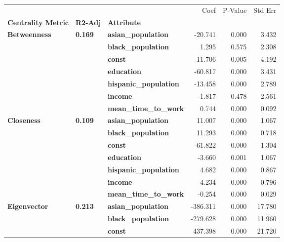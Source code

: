\begin{tabular}{lllrrr}
\toprule
             &       &                   &     Coef &  P-Value &  Std Err \\
\textbf{Centrality Metric} & \textbf{R2-Adj} & \textbf{Attribute} &          &          &          \\
\midrule
\multirow{7}{*}{\textbf{Betweenness}} & \multirow{7}{*}{\textbf{0.169}} & \textbf{asian\_population} &  -20.741 &    0.000 &    3.432 \\
             &       & \textbf{black\_population} &    1.295 &    0.575 &    2.308 \\
             &       & \textbf{const} &  -11.706 &    0.005 &    4.192 \\
             &       & \textbf{education} &  -60.817 &    0.000 &    3.431 \\
             &       & \textbf{hispanic\_population} &  -13.458 &    0.000 &    2.789 \\
             &       & \textbf{income} &   -1.817 &    0.478 &    2.561 \\
             &       & \textbf{mean\_time\_to\_work} &    0.744 &    0.000 &    0.092 \\
\cline{1-6}
\cline{2-6}
\multirow{7}{*}{\textbf{Closeness}} & \multirow{7}{*}{\textbf{0.109}} & \textbf{asian\_population} &   11.007 &    0.000 &    1.067 \\
             &       & \textbf{black\_population} &   11.293 &    0.000 &    0.718 \\
             &       & \textbf{const} &  -61.822 &    0.000 &    1.304 \\
             &       & \textbf{education} &   -3.660 &    0.001 &    1.067 \\
             &       & \textbf{hispanic\_population} &    4.682 &    0.000 &    0.867 \\
             &       & \textbf{income} &   -4.234 &    0.000 &    0.796 \\
             &       & \textbf{mean\_time\_to\_work} &   -0.254 &    0.000 &    0.029 \\
\cline{1-6}
\cline{2-6}
\multirow{7}{*}{\textbf{Eigenvector}} & \multirow{7}{*}{\textbf{0.213}} & \textbf{asian\_population} & -386.311 &    0.000 &   17.780 \\
             &       & \textbf{black\_population} & -279.628 &    0.000 &   11.960 \\
             &       & \textbf{const} &  437.398 &    0.000 &   21.720 \\

\end{tabular}
